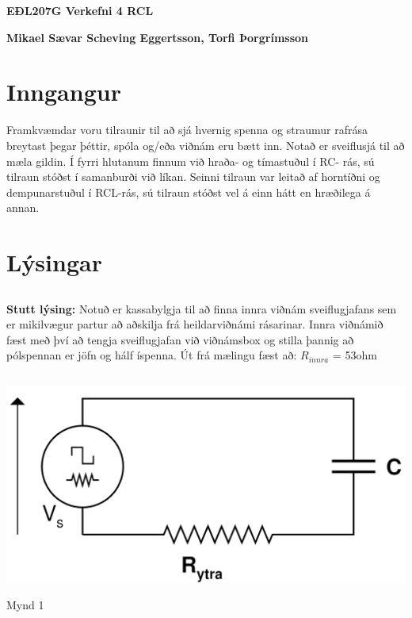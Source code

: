 \documentclass[12pt]{article}
\begin{document}
\centerline{\bf \Huge EÐL207G Verkefni 4 RCL}
\centerline{\bf Mikael Sævar Scheving Eggertsson, Torfi Þorgrímsson}

\centerline{\bf \large }

\tableofcontents
\newpage

\section{Inngangur}
Framkvæmdar voru tilraunir til að sjá hvernig spenna og straumur rafrása breytast þegar þéttir, spóla og/eða viðnám eru bætt inn. 
Notað er sveiflusjá til að mæla gildin. Í fyrri hlutanum finnum við hraða- og tímastuðul í RC- rás,
sú tilraun stóðst í samanburði við líkan. Seinni tilraun var leitað af horntíðni og dempunarstuðul
í RCL-rás, sú tilraun stóðst vel á einn hátt en hræðilega á annan. 
\section{Lýsingar}
\subsection{}

\setlength{\parindent}{0pt}

\textbf{Stutt lýsing:}
Notuð er kassabylgja til að finna innra viðnám sveiflugjafans sem er mikilvægur partur að aðskilja frá heildarviðnámi rásarinar. 
Innra viðnámið fæst með því að tengja sveiflugjafan við viðnámsbox og stilla þannig að pólspennan er jöfn og hálf íspenna.
Út frá mælingu fæst að: $R_{innra}$ = 53ohm

\subsection{}

\begin{center}
    \includegraphics[scale=0.4]{mynd1}

Mynd 1
\end{center}
\end{document}
